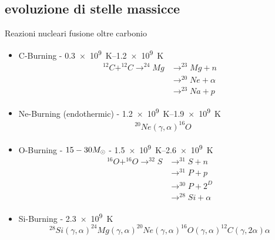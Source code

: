 \subsection{evoluzione di stelle massicce}

\begin{frame}{Reazioni nucleari fusione oltre carbonio}
    \begin{itemize}
        \item C-Burning - \SIrange{0.3e9}{1.2e9}{\kelvin}
            \begin{align*}
                ^{12}C+^{12}C\to^{24}Mg&\to^{23}Mg+n\\
                &\to^{20}Ne+\alpha\\
                &\to^{23}Na+p
            \end{align*}
        \item Ne-Burning (endothermic) - \SIrange{1.2e9}{1.9e9}{\kelvin}
            \begin{align*}
                &^{20}Ne(\gamma,\alpha)^{16}O
            \end{align*}
        \item O-Burning - $15-30M_{\odot}{}$ - \SIrange{1.5e9}{2.6e9}{\kelvin}
            \begin{align*}
                ^{16}O+^{16}O\to^{32}S&\to^{31}S+n\\
                &\to^{31}P+p\\
                &\to^{30}P+2^D\\
                &\to^{28}Si+\alpha
            \end{align*}
        \item Si-Burning - \SI{2.3e9}{\kelvin}
            \begin{equation*}
                ^{28}Si(\gamma,\alpha)^{24}Mg(\gamma,\alpha)^{20}Ne(\gamma,\alpha)^{16}O(\gamma,\alpha)^{12}C(\gamma,2\alpha)\alpha
            \end{equation*}
    \end{itemize}
\end{frame}

